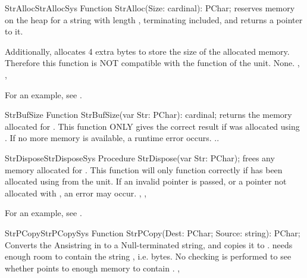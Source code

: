 \begin{functionl}{StrAlloc}{StrAllocSys}
\Declaration
Function StrAlloc(Size: cardinal): PChar;
\Description
{} reserves memory on the heap for a string with length ,
terminating  included, and returns a pointer to it.

Additionally,  allocates 4 extra bytes to store the size of
the allocated memory. Therefore this function is NOT compatible with the
 function of the  unit.
\Errors
None.
\SeeAlso
{}, , 
\end{functionl}

For an example, see .

\begin{function}{StrBufSize}
\Declaration
Function StrBufSize(var Str: PChar): cardinal;
\Description
{} returns the memory allocated for . This function
ONLY gives the correct result if  was allocated using
.
\Errors
If no more memory is available, a runtime error occurs.
\SeeAlso
{}..
\end{function}




\begin{procedurel}{StrDispose}{StrDisposeSys}
\Declaration
Procedure StrDispose(var Str: PChar);
\Description
{} frees any memory allocated for . This function
will only function correctly if  has been allocated using
 from the  unit.
\Errors
If an invalid pointer is passed, or a pointer not allocated with
, an error may occur.
\SeeAlso
{}, , 
\end{procedurel}

For an example, see .

\begin{functionl}{StrPCopy}{StrPCopySys}
\Declaration
Function StrPCopy(Dest: PChar; Source: string): PChar;
\Description
{} Converts the Ansistring in  to a Null-terminated
string, and copies it to .  needs enough room to contain
the string , i.e.  bytes.
\Errors
No checking is performed to see whether  points to enough memory
to contain .
\SeeAlso
{}, 
\end{functionl}

